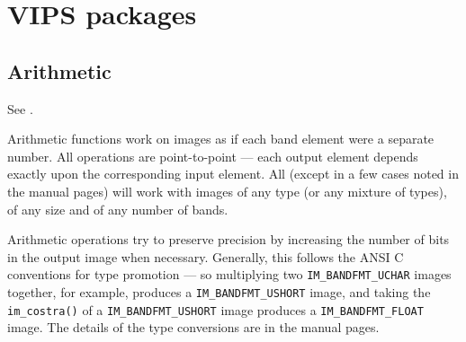 \section{VIPS packages}

\subsection{Arithmetic}

See .

Arithmetic functions work on images as if each band element were a separate
number. All operations are point-to-point --- each output element depends
exactly upon the corresponding input element. All (except in a few cases
noted in the manual pages) will work with images of any type (or any mixture
of types), of any size and of any number of bands.

Arithmetic operations try to preserve precision by increasing the number of
bits in the output image when necessary. Generally, this follows the ANSI C
conventions for type promotion --- so multiplying two \verb+IM_BANDFMT_UCHAR+
images together, for example, produces a \verb+IM_BANDFMT_USHORT+ image, and
taking the \verb+im_costra()+ of a \verb+IM_BANDFMT_USHORT+ image produces
a \verb+IM_BANDFMT_FLOAT+ image. The details of the type conversions are
in the manual pages.

